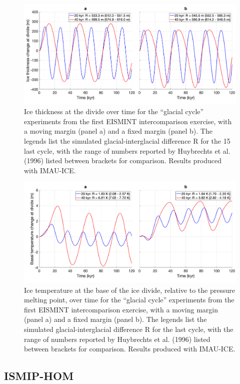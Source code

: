 \documentclass{article}
\begin{document}
\begin{figure}[H]
  \includegraphics[width=0.95\linewidth]{Fig_benchmark_EISMINT1.png}
  \caption{Ice thickness at the divide over time for the “glacial cycle” experiments from the first EISMINT intercomparison exercise, with a moving margin (panel a) and a fixed margin (panel b). The legends list the simulated glacial-interglacial difference R for the 15 last cycle, with the range of numbers reported by Huybrechts et al. (1996) listed between brackets for comparison. Results produced with IMAU-ICE.}
\end{figure}

\begin{figure}[H]
  \includegraphics[width=0.95\linewidth]{Fig_benchmark_EISMINT2.png}
  \caption{Ice temperature at the base of the ice divide, relative to the pressure melting point, over time for the “glacial cycle” experiments from the first EISMINT intercomparison exercise, with a moving margin (panel a) and a fixed margin (panel b). The legends list the simulated glacial-interglacial difference R for the last cycle, with the range of numbers reported by Huybrechts et al. (1996) listed between brackets for comparison. Results produced with IMAU-ICE.}
\end{figure}

\subsection{ISMIP-HOM}
\end{document}
